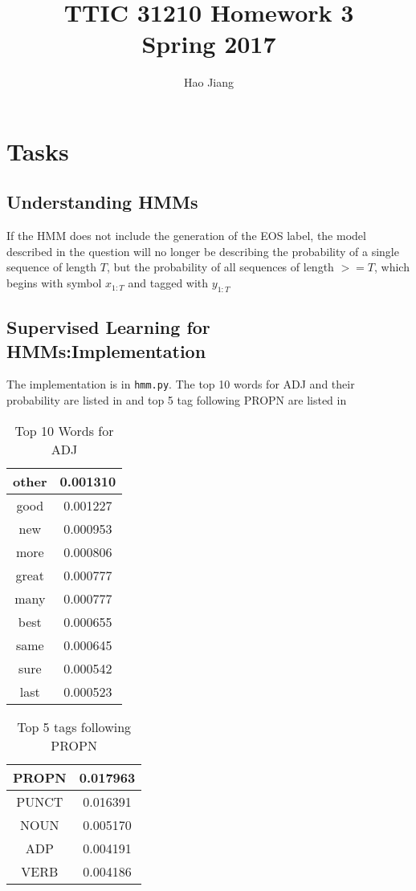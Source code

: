 \documentclass{article}
\title{TTIC 31210 Homework 3 \\ Spring 2017}
\author{Hao Jiang}
\begin{document}
\maketitle
\section{Tasks}
\subsection{Understanding HMMs}
If the HMM does not include the generation of the EOS label, the model described in the question
will no longer be describing the probability of a single sequence of length $T$, but the probability
of all sequences of length $>= T$, which begins with symbol $x_{1:T}$ and tagged with $y_{1:T}$

\subsection{Supervised Learning for HMMs:Implementation}

The implementation is in \texttt{hmm.py}. The top 10 words for ADJ and their probability are listed 
in  and top 5 tag following PROPN are listed in 
\begin{table}
\centering
\begin{tabular}{c|c}
other & 0.001310 \\\hline
good & 0.001227 \\\hline
new & 0.000953 \\\hline
more & 0.000806 \\\hline
great & 0.000777 \\\hline
many & 0.000777 \\\hline
best & 0.000655 \\\hline
same & 0.000645 \\\hline
sure & 0.000542 \\\hline
last & 0.000523 \\
\end{tabular}
\caption{Top 10 Words for ADJ}
\label{tab:top10adj}
\end{table}
\renewcommand{\arraystretch}{1.5}
\begin{table}
\centering
\begin{tabular}{c|c}
PROPN & 0.017963\\\hline
PUNCT & 0.016391\\\hline
NOUN & 0.005170\\\hline
ADP & 0.004191\\\hline
VERB & 0.004186\\\hline
\end{tabular}
\caption{Top 5 tags following PROPN}
\label{tab:top5propn}
\end{table}
\end{document}
